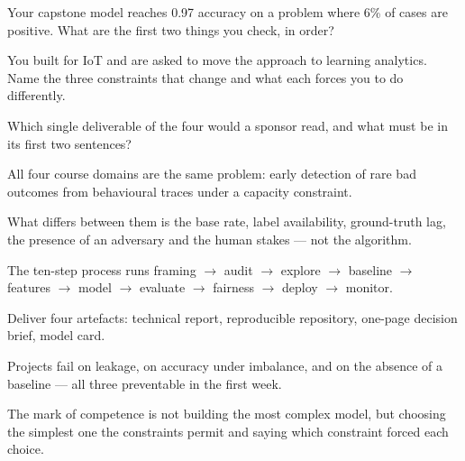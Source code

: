 \begin{checkpoint}
\begin{tightnum}
  \item Your capstone model reaches 0.97 accuracy on a problem where 6\% of cases are
        positive. What are the first two things you check, in order?
  \item You built for IoT and are asked to move the approach to learning analytics.
        Name the three constraints that change and what each forces you to do
        differently.
  \item Which single deliverable of the four would a sponsor read, and what must be
        in its first two sentences?
\end{tightnum}
\end{checkpoint}

\begin{chaptersummary}
\begin{tight}
  \item All four course domains are the same problem: early detection of rare bad
        outcomes from behavioural traces under a capacity constraint.
  \item What differs between them is the base rate, label availability,
        ground-truth lag, the presence of an adversary and the human stakes --- not
        the algorithm.
  \item The ten-step process runs framing $\rightarrow$ audit $\rightarrow$ explore
        $\rightarrow$ baseline $\rightarrow$ features $\rightarrow$ model
        $\rightarrow$ evaluate $\rightarrow$ fairness $\rightarrow$ deploy
        $\rightarrow$ monitor.
  \item Deliver four artefacts: technical report, reproducible repository, one-page
        decision brief, model card.
  \item Projects fail on leakage, on accuracy under imbalance, and on the absence of
        a baseline --- all three preventable in the first week.
  \item The mark of competence is not building the most complex model, but choosing
        the simplest one the constraints permit and saying which constraint forced
        each choice.
\end{tight}
\end{chaptersummary}

